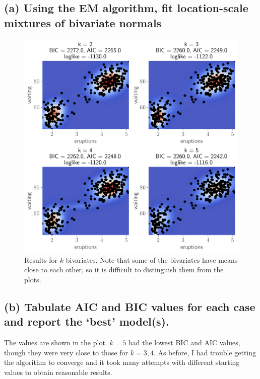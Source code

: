 \documentclass[11pt]{article}
\begin{document}
\subsection*{(a) Using the EM algorithm, fit location-scale mixtures of bivariate normals}
\begin{figure}[!h]
    \centering
    \includegraphics[scale=.6
    ]{homework_4/figures/bivariate.png}
    \caption{Results for $k$ bivariates. Note that some of the bivariates have means close to each other, so it is difficult to distinguish them from the plots.}
    \label{fig:my_label}
\end{figure}
\newpage
\subsection*{(b) Tabulate AIC and BIC values for each case and report the ‘best’ model(s).}
The values are shown in the plot. $k=5$ had the lowest BIC and AIC values, though they were very close to those for $k=3, 4$. As before, I had trouble getting the algorithm to converge and it took many attempts with different starting values to obtain reasonable results.
\end{document}
